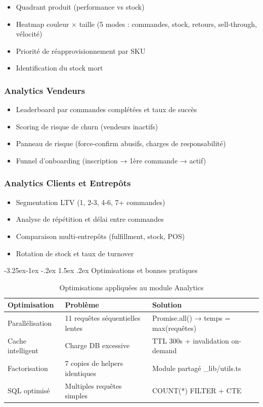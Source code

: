 \documentclass[12pt,a4paper,openany]{report}
\makeatletter
\renewcommand\subsection{\@startsection{subsection}{2}{\z@}%
  {-3.25ex\@plus -1ex \@minus -.2ex}%
  {1.5ex \@plus .2ex}%
  {\needspace{8\baselineskip}\normalfont\large\bfseries\color{primary!80!black}}}
\makeatother
\begin{document}
\begin{itemize}
  \item Quadrant produit (performance vs stock)
  \item Heatmap couleur × taille (5 modes : commandes, stock, retours, sell-through, vélocité)
  \item Priorité de réapprovisionnement par SKU
  \item Identification du stock mort
\end{itemize}

\subsubsection{Analytics Vendeurs}

\begin{itemize}
  \item Leaderboard par commandes complétées et taux de succès
  \item Scoring de risque de churn (vendeurs inactifs)
  \item Panneau de risque (force-confirm abusifs, charges de responsabilité)
  \item Funnel d'onboarding (inscription → 1ère commande → actif)
\end{itemize}

\subsubsection{Analytics Clients et Entrepôts}

\begin{itemize}
  \item Segmentation LTV (1, 2-3, 4-6, 7+ commandes)
  \item Analyse de répétition et délai entre commandes
  \item Comparaison multi-entrepôts (fulfillment, stock, POS)
  \item Rotation de stock et taux de turnover
\end{itemize}

\subsection{Optimisations et bonnes pratiques}

\begin{table}[H]
\centering
{}
\begin{tabularx}{\textwidth}{lXX}
\toprule
\rowcolor{headerblue!20}
\textbf{Optimisation} & \textbf{Problème} & \textbf{Solution} \\
\midrule
Parallélisation & 11 requêtes séquentielles lentes & Promise.all() → temps = max(requêtes) \\
Cache intelligent & Charge DB excessive & TTL 300s + invalidation on-demand \\
Factorisation & 7 copies de helpers identiques & Module partagé \_lib/utils.ts \\
SQL optimisé & Multiples requêtes simples & COUNT(*) FILTER + CTE \\
\bottomrule
\end{tabularx}
\caption{Optimisations appliquées au module Analytics}
\end{table}
\end{document}
